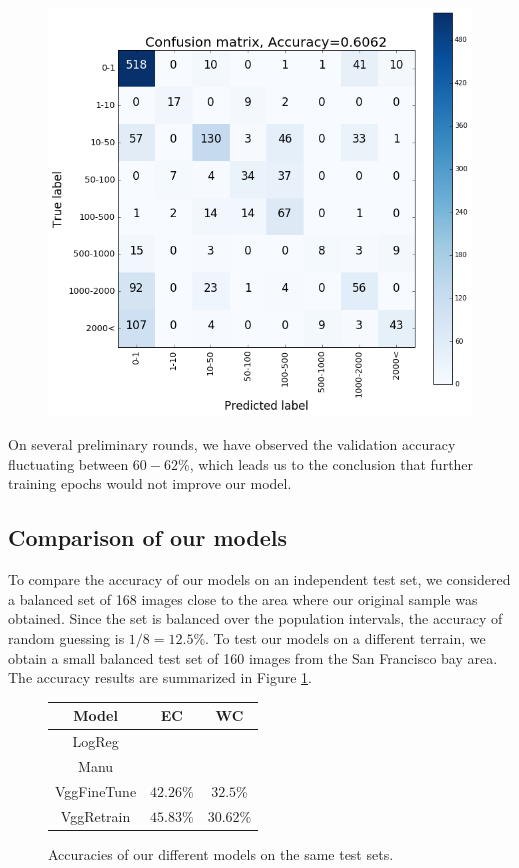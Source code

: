\documentclass{article}
\begin{document}
\begin{figure}[ht]
\centering
\includegraphics[scale=0.45]{conf_mx_Zsolt2.png}
\end{figure}

On several preliminary rounds, we have observed the validation accuracy fluctuating between $60-62\%$, which leads us to the conclusion that further training epochs would not improve our model.



\subsection{Comparison of our models}
To compare the accuracy of our models on an independent test set, we considered a balanced set of 168 images close to the area where our original sample was obtained. Since the set is balanced over the population intervals, the accuracy of random guessing is $1/8=12.5\%$. To test our models on a different terrain, we obtain a small balanced test set of 160 images from the San Francisco bay area. The accuracy results are summarized in Figure \ref{fig:accur-comp}.

\begin{figure}[ht]
\center
\begin{tabular}{ |c|c|c| } 
\hline
Model & EC & WC\\
\hline
LogReg& &\\ 
Manu& &\\ 
VggFineTune& $42.26\%$ & $32.5\%$\\
VggRetrain& $45.83\%$ & $30.62\%$\\
\hline
\end{tabular}
\caption{Accuracies of our different models on the same test sets.}
\label{fig:accur-comp}
\end{figure}
\end{document}
